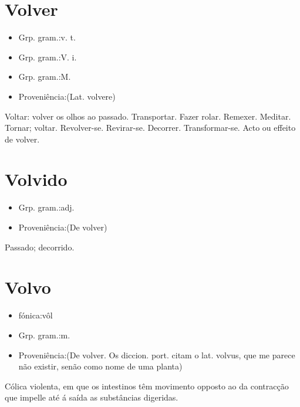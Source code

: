 \documentclass{article}
\begin{document}
\section{Volver}
\begin{itemize}
\item {Grp. gram.:v. t.}
\end{itemize}
\begin{itemize}
\item {Grp. gram.:V. i.}
\end{itemize}
\begin{itemize}
\item {Grp. gram.:M.}
\end{itemize}
\begin{itemize}
\item {Proveniência:(Lat. \textunderscore volvere\textunderscore )}
\end{itemize}
Voltar: \textunderscore volver os olhos ao passado\textunderscore .
Transportar.
Fazer rolar.
Remexer.
Meditar.
Tornar; voltar.
Revolver-se.
Revirar-se.
Decorrer.
Transformar-se.
Acto ou effeito de volver.
\section{Volvido}
\begin{itemize}
\item {Grp. gram.:adj.}
\end{itemize}
\begin{itemize}
\item {Proveniência:(De \textunderscore volver\textunderscore )}
\end{itemize}
Passado; decorrido.
\section{Volvo}
\begin{itemize}
\item {fónica:vôl}
\end{itemize}
\begin{itemize}
\item {Grp. gram.:m.}
\end{itemize}
\begin{itemize}
\item {Proveniência:(De \textunderscore volver\textunderscore . Os diccion. port. citam o lat. \textunderscore volvus\textunderscore , que me parece não existir, senão como nome de uma planta)}
\end{itemize}
Cólica violenta, em que os intestinos têm movimento opposto ao da contracção que impelle até á saída as substâncias digeridas.
\end{document}
